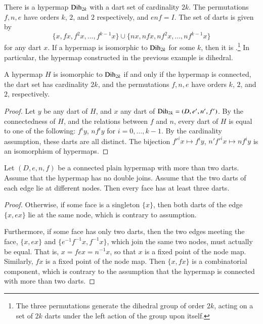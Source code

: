 \begin{example}[dihedral]\label{ex:D2k} 
There is a hypermap ${\operatorname{Dih}}_{2k}$ with a dart set of cardinality $2k$.
The permutations $f,n,e$ have  orders $k$, $2$, and $2$ respectively, and 
$e n f = I$.
The set of darts is given by
\[ 
\{x, f x,f^2 x,\ldots,f^{k-1} x\}\cup \{n x, n f x, n f^2 x,\ldots, n f^{k-1} x\}
\] 
for any dart $x$.
If a hypermap is isomorphic to ${\operatorname{Dih}}_{2k}$ for
some $k$, then it is .\footnote{The three permutations generate the dihedral
group of order $2k$, acting on a set of $2k$ darts under the left action of the group upon itself.}   
In particular,
the hypermap constructed in the previous example is dihedral.
%
\end{example}

\begin{lemma}\cutrate{}\label{lemma:dih-iso}
  A hypermap $H$ is isomorphic to ${\operatorname{Dih}}_{2k}$ if and only if the
  hypermap is connected, the dart set has cardinality $2k$, and the
  permutations $f,n,e$ have orders $k$, $2$, and $2$, respectively.
\end{lemma}

\begin{proof} Let $y$ be any dart of $H$, and $x$ any dart of
  ${\operatorname{Dih}}_{2k}=(D,e',n',f')$.  By the connectedness of $H$, and the
  relations between $f$ and $n$, every dart of $H$ is equal to one of
  the following: $f^i y$, $n f^i y$ for $i=0,\ldots,k-1$.  By the
  cardinality assumption, these darts are all distinct.  The bijection
  ${f'}^i x \mapsto f^i y$, $n' {f'}^i x \mapsto n f^i y$ is an
  isomorphism of hypermaps.
\end{proof}

\begin{lemma}\label{lemma:dj}
Let $(D,e,n,f)$ be a connected plain hypermap with more than
two darts.  Assume that the hypermap has no  double joins. Assume that the
two darts of each edge lie at different nodes.
Then
every face has at least three darts.
\end{lemma}

\begin{proof}
Otherwise, if some face is a singleton $\{x\}$, then both darts
of the edge $\{x,e x\}$ lie at the same node, which is contrary to
assumption.

  Furthermore, if some face has only two darts, then 
 the two edges meeting the face, $\{x, e x\}$
  and $\{ e^{-1} f^{-1} x, f^{-1} x\}$, which join the same two nodes,
 must actually be equal.  That
  is, $ x = f e x = n^{-1} x$, so that $x$ is a fixed point of the node
  map.  Similarly, $f x$ is a fixed point of the node map.  Then $\{x,
  f x\}$ is a combinatorial component, which is contrary to the
  assumption that the hypermap is connected with more than two darts.
\end{proof}


